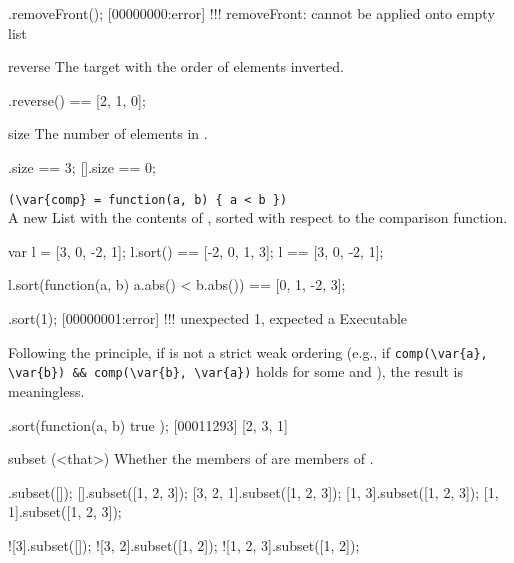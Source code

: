 \begin{urbiscriptapi}
\begin{urbiassert}
[].removeFront();
[00000000:error] !!! removeFront: cannot be applied onto empty list
\end{urbiassert}


\item[reverse]
  The target with the order of elements inverted.
\begin{urbiassert}
[0, 1, 2].reverse() == [2, 1, 0];
\end{urbiassert}


\item[size]
  The number of elements in \this.
\begin{urbiassert}
[0, 1, 2].size == 3;
[].size == 0;
\end{urbiassert}


\item {}\lstinline|(\var{comp} = function(a, b) { a < b })|\\%
  A new List with the contents of \this, sorted with respect to the
   comparison function.
\begin{urbiassert}
var l = [3, 0, -2, 1];
l.sort() == [-2, 0, 1, 3];
l      == [3, 0, -2, 1];

l.sort(function(a, b) {a.abs() < b.abs()})
       == [0, 1, -2, 3];
\end{urbiassert}

\begin{urbiscript}
[2, 1].sort(1);
[00000001:error] !!! unexpected 1, expected a Executable
\end{urbiscript}

Following the 
principle, if  is not a strict weak ordering (e.g., if
\lstinline|comp(\var{a}, \var{b}) && comp(\var{b}, \var{a})| holds for some
 and ), the result is meaningless.

\begin{urbiscript}
[1, 2, 3].sort(function(a, b) { true });
[00011293] [2, 3, 1]
\end{urbiscript}


\item[subset](<that>)%
  Whether the members of \this are members of .

\begin{urbiassert}
        [].subset([]);
        [].subset([1, 2, 3]);
 [3, 2, 1].subset([1, 2, 3]);
    [1, 3].subset([1, 2, 3]);
    [1, 1].subset([1, 2, 3]);

      ![3].subset([]);
   ![3, 2].subset([1, 2]);
![1, 2, 3].subset([1, 2]);
\end{urbiassert}



\end{urbiscriptapi}
